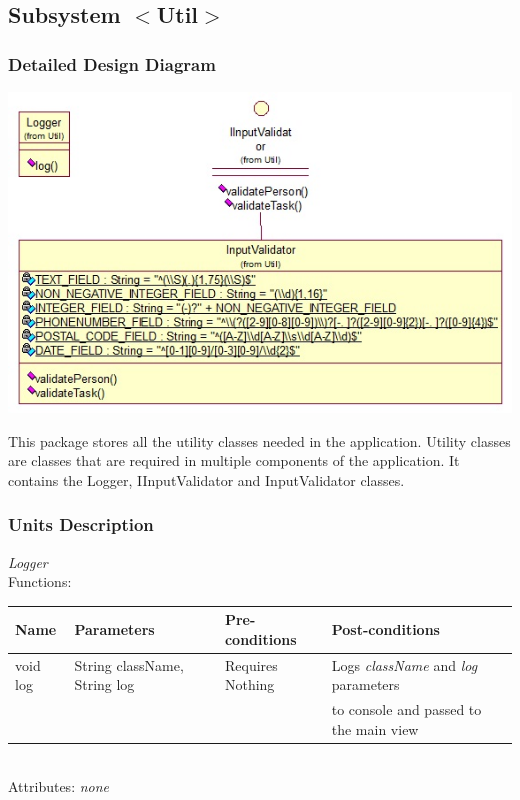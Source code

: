\subsection{Subsystem $<$Util$>$}

\subsubsection{Detailed Design Diagram}
\includegraphics{subsystems/diagrams/utils_class_diagram}

This package stores all the utility classes needed in the application. Utility classes are classes that are required in multiple components of the application. It contains the Logger, IInputValidator and InputValidator classes.

\subsubsection{Units Description}

\emph{Logger}\\
Functions:\\
\begin{tabular}{| l | l | l | l |}
\hline
Name & Parameters & Pre-conditions & Post-conditions\\
\hline
	void log	& String className, String log 	& Requires Nothing 		& Logs \emph{className} and \emph{log} parameters\\
			&  					& 				& to console and passed to the main view
\\
\hline
\end{tabular}
\\

Attributes: \emph{none}
\\

